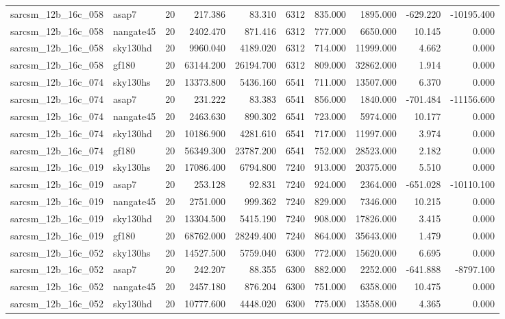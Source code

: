 \begin{longtable}{llrrrrrrrr}
sarcsm\_12b\_16c\_058 & asap7 & 20 & 217.386 & 83.310 & 6312 & 835.000 & 1895.000 & -629.220 & -10195.400 \\
sarcsm\_12b\_16c\_058 & nangate45 & 20 & 2402.470 & 871.416 & 6312 & 777.000 & 6650.000 & 10.145 & 0.000 \\
sarcsm\_12b\_16c\_058 & sky130hd & 20 & 9960.040 & 4189.020 & 6312 & 714.000 & 11999.000 & 4.662 & 0.000 \\
sarcsm\_12b\_16c\_058 & gf180 & 20 & 63144.200 & 26194.700 & 6312 & 809.000 & 32862.000 & 1.914 & 0.000 \\
sarcsm\_12b\_16c\_074 & sky130hs & 20 & 13373.800 & 5436.160 & 6541 & 711.000 & 13507.000 & 6.370 & 0.000 \\
sarcsm\_12b\_16c\_074 & asap7 & 20 & 231.222 & 83.383 & 6541 & 856.000 & 1840.000 & -701.484 & -11156.600 \\
sarcsm\_12b\_16c\_074 & nangate45 & 20 & 2463.630 & 890.302 & 6541 & 723.000 & 5974.000 & 10.177 & 0.000 \\
sarcsm\_12b\_16c\_074 & sky130hd & 20 & 10186.900 & 4281.610 & 6541 & 717.000 & 11997.000 & 3.974 & 0.000 \\
sarcsm\_12b\_16c\_074 & gf180 & 20 & 56349.300 & 23787.200 & 6541 & 752.000 & 28523.000 & 2.182 & 0.000 \\
sarcsm\_12b\_16c\_019 & sky130hs & 20 & 17086.400 & 6794.800 & 7240 & 913.000 & 20375.000 & 5.510 & 0.000 \\
sarcsm\_12b\_16c\_019 & asap7 & 20 & 253.128 & 92.831 & 7240 & 924.000 & 2364.000 & -651.028 & -10110.100 \\
sarcsm\_12b\_16c\_019 & nangate45 & 20 & 2751.000 & 999.362 & 7240 & 829.000 & 7346.000 & 10.215 & 0.000 \\
sarcsm\_12b\_16c\_019 & sky130hd & 20 & 13304.500 & 5415.190 & 7240 & 908.000 & 17826.000 & 3.415 & 0.000 \\
sarcsm\_12b\_16c\_019 & gf180 & 20 & 68762.000 & 28249.400 & 7240 & 864.000 & 35643.000 & 1.479 & 0.000 \\
sarcsm\_12b\_16c\_052 & sky130hs & 20 & 14527.500 & 5759.040 & 6300 & 772.000 & 15620.000 & 6.695 & 0.000 \\
sarcsm\_12b\_16c\_052 & asap7 & 20 & 242.207 & 88.355 & 6300 & 882.000 & 2252.000 & -641.888 & -8797.100 \\
sarcsm\_12b\_16c\_052 & nangate45 & 20 & 2457.180 & 876.204 & 6300 & 751.000 & 6358.000 & 10.475 & 0.000 \\
sarcsm\_12b\_16c\_052 & sky130hd & 20 & 10777.600 & 4448.020 & 6300 & 775.000 & 13558.000 & 4.365 & 0.000 \\

\end{longtable}
